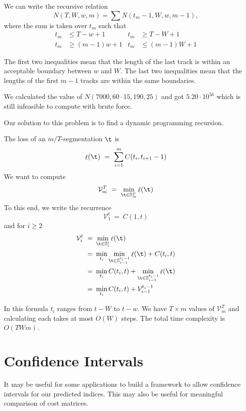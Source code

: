 \documentclass[twocolumn]{article}
\DeclareMathOperator{\loss}{\ell}
\newcommand{\segs}{\mathbb S}
\newcommand{\best}{\mathcal V}
\begin{document}
	We can write the recursive relation $$N(T,W,w,m) = \sum N(t_m-1,W,w,m-1),$$ where the sum is taken over $t_m$ such that 
	\begin{align*}
		t_m &\le T-w+1 & t_m &\ge T-W+1\\
		t_m &\ge (m-1)w+1 & t_m &\le (m-1)W+1
	\end{align*}
	
	The first two inequalities mean that the length of the last track is within an acceptable boundary between $w$ and $W$. The last two inequalities mean that the lengths of the first $m-1$ tracks are within the same boundaries. 
	
	We calculated the value of $N(7000,60\cdot15,190,25)$ and got $5.20 \cdot 10^{56}$ which is still infeasible to compute with brute force.
	
	Our solution to this problem is to find a dynamic programming recursion.
	
	The loss of an $m/T$-segmentation $\t$ is 
	\[
	\loss(\t) 
	~=~
	\sum_{i=1}^m C(t_i, t_{i+1}-1)
	\]
	We want to compute
	\[
	\best^T_m ~=~ \min_{\t \in \segs^T_m} \loss(\t)
	\]
	To this end, we write the recurrence
	\begin{equation*}
		\best^t_1 ~=~ C(1, t) 
	\end{equation*}
	and for $i\ge2$
\begin{align*}
		\best^t_i ~=~& \min_{\t \in \segs^t_i} \loss(\t)  \\
		~=~& \min_{t_i} \min_{\t \in \segs^{t_i-1}_{i-1}} \loss(\t) + C(t_i, t)  \\
		~=~&  	\min_{t_i} C(t_i, t) + \min_{\t \in \segs^{t_i-1}_{i-1}} \loss(\t)  \\ 
		~=~& \min_{t_i} C(t_i, t) + \best^{t_i-1}_{i-1} \\
\end{align*}
	
	In this formula $t_i$ ranges from $t-W$ to $t-w$. We have $T \times m$ values of $\best^T_m$ and calculating each takes at most $O(W)$ steps. The total time complexity is $O(TWm)$.
	
\section{Confidence Intervals}\label{sec:confidence-intervals}
	
It may be useful for some applications to build a framework to allow confidence intervals for our predicted indices. This may also be useful for meaningful comparison of cost matrices.
	
\end{document}

